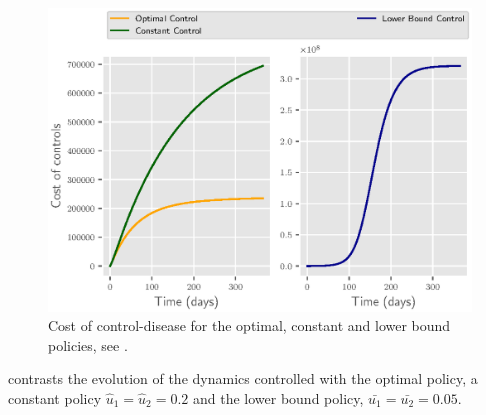 \begin{figure}[H]
  \centering
  \includegraphics{Figures/figure_3_sars}
  \caption{
    Cost of control-disease for the optimal, constant and lower bound
    policies, see .
  }
  \label{fig:figure3sars}
\end{figure}

 contrasts the evolution of the dynamics controlled with
the optimal policy, a constant policy 
$\widehat{u}_1 = \widehat{u}_2=\num{0.2}$ and the lower bound policy,
$\bar{u_1} = \bar{u_2} = \num{0.05}$.